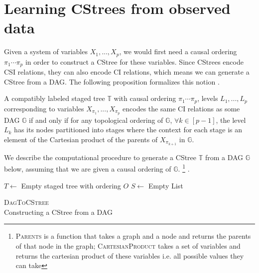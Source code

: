 \documentclass{tufte-book}
\begin{document}
\section{Learning CStrees from observed data}
\label{sec:orgb0b5af6}
Given a system of variables \(X_1,...,X_p\), we would first need a causal ordering \(\pi_1 \cdots \pi_p\) in order to construct a CStree for these variables. Since CStrees encode CSI relations, they can also encode CI relations, which means we can generate a CStree from a DAG. The following proposition formalizes this notion \cite{duarte-2020-algeb}.

\begin{proposition}\label{prop:dagandcstree}
A compatibly labeled staged tree $\mathbb{T}$ with causal ordering $\pi_1 \cdots\pi_p$, levels $L_1,...,L_p$ corresponding to variables $X_{\pi_1},...,X_{\pi_p}$ encodes the same CI relations as some DAG $\mathbb{G}$ if and only if for any topological ordering of $\mathbb{G}$, $\forall k \in [p-1]$, the level $L_k$ has its nodes partitioned into stages where the context for each stage is an element of the Cartesian product of the parents of $X_{\pi_{k+1}}$ in $\mathbb{G}$.
\end{proposition}

We describe the computational procedure to generate a CStree \(\mathbb{T}\) from a DAG \(\mathbb{G}\) below, assuming that we are given a causal ordering of \(\mathbb{G}\).  \footnote{\textsc{Parents} is a function that takes a graph and a node and returns the parents of that node in the graph; \textsc{CartesianProduct} takes a set of variables and returns the cartesian product of these variables i.e. all possible values they can take} .



\begin{algorithm}[H]
\label{alg:dagtocstree}
      \SetAlgoLined
      $T \gets$ Empty staged tree with ordering $O$\;
      $S \gets$ Empty List\;
       \caption{\textsc{DagToCStree}\\Constructing a CStree from a DAG}
      \end{algorithm}
\end{document}
